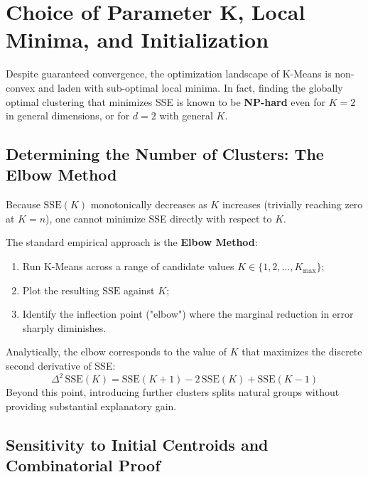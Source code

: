 \section{Choice of Parameter K, Local Minima, and Initialization}
\label{sec:dm-kmeans-k-choice-local-minima}

Despite guaranteed convergence, the optimization landscape of K-Means is non-convex and laden with sub-optimal local minima. In fact, finding the globally optimal clustering that minimizes SSE is known to be \textbf{NP-hard} even for $K = 2$ in general dimensions, or for $d = 2$ with general $K$.

\subsection{Determining the Number of Clusters: The Elbow Method}
\label{sec:dm-kmeans-elbow-method}

Because $\mathrm{SSE}(K)$ monotonically decreases as $K$ increases (trivially reaching zero at $K = n$), one cannot minimize SSE directly with respect to $K$.

The standard empirical approach is the \textbf{Elbow Method}:
\begin{enumerate}
    \item Run K-Means across a range of candidate values $K \in \{1, 2, \dots, K_{\max}\}$;
    \item Plot the resulting $\mathrm{SSE}$ against $K$;
    \item Identify the inflection point ("elbow") where the marginal reduction in error sharply diminishes.
\end{enumerate}
Analytically, the elbow corresponds to the value of $K$ that maximizes the discrete second derivative of SSE:
\begin{equation}
    \Delta^2 \, \mathrm{SSE}(K) = \mathrm{SSE}(K+1) - 2 \, \mathrm{SSE}(K) + \mathrm{SSE}(K-1)
\end{equation}
Beyond this point, introducing further clusters splits natural groups without providing substantial explanatory gain.

\subsection{Sensitivity to Initial Centroids and Combinatorial Proof}

